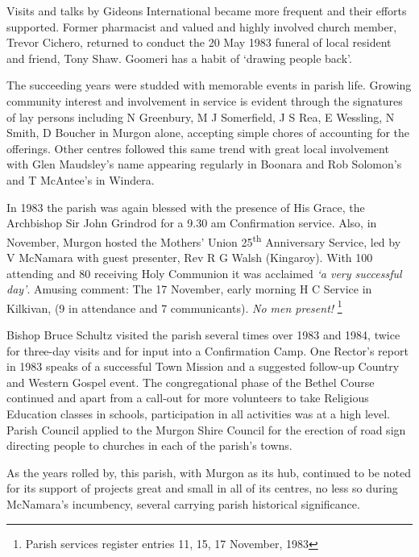 Visits and talks by Gideons International became more frequent and their efforts supported. Former pharmacist and valued and highly involved church member, Trevor Cichero, returned to conduct the 20 May 1983 funeral of local resident and friend, Tony Shaw. Goomeri has a habit of `drawing people back'.



The succeeding years were studded with memorable events in parish life. Growing community interest and involvement in service is evident through the signatures of lay persons including N Greenbury, M J Somerfield, J S Rea, E Wessling, N Smith, D Boucher in Murgon alone, accepting simple chores of accounting for the offerings. Other centres followed this same trend with great local involvement with Glen Maudsley's name appearing regularly in Boonara and Rob Solomon's and T McAntee's in Windera.



In 1983 the parish was again blessed with the presence of His Grace, the Archbishop Sir John Grindrod for a 9.30 am Confirmation service. Also, in November, Murgon hosted the Mothers' Union 25\textsuperscript{th} Anniversary Service, led by V McNamara with guest presenter, Rev R G Walsh (Kingaroy). With 100 attending and 80 receiving Holy Communion it was acclaimed \emph{`a very successful day'}. Amusing comment: The 17 November, early morning H C Service in Kilkivan, (9 in attendance and 7 communicants). \emph{No men present!} \footnote{Parish services register entries 11, 15, 17 November, 1983}


Bishop Bruce Schultz visited the parish several times over 1983 and 1984, twice for three-day visits and for input into a Confirmation Camp. One Rector's report in 1983 speaks of a successful Town Mission and a suggested follow-up Country and Western Gospel event. The congregational phase of the Bethel Course continued and apart from a call-out for more volunteers to take Religious Education classes in schools, participation in all activities was at a high level. Parish Council applied to the Murgon Shire Council for the erection of road sign directing people to churches in each of the parish's towns.



As the years rolled by, this parish, with Murgon as its hub, continued to be noted for its support of projects great and small in all of its centres, no less so during McNamara's incumbency, several carrying parish historical significance.



